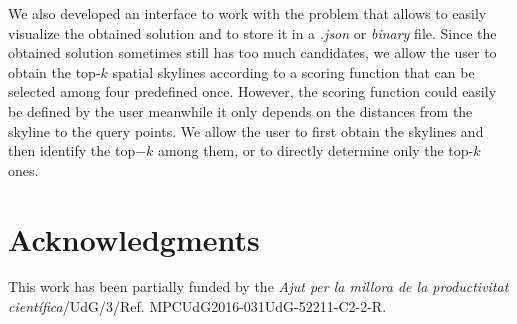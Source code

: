 \documentclass[11pt,onecolumn]{elsart3p}
\begin{document}
We also developed an interface to work with the problem that allows to easily visualize the obtained solution and to store it in a {\it .json} or {\it binary} file. Since the obtained solution sometimes still has too much candidates, we allow the user to obtain the top-$k$ spatial skylines according to a scoring function that can be selected among four predefined once. However, the scoring function could easily be defined by the user meanwhile it only depends on the distances from the skyline to the query points. We allow the user to first obtain the skylines and then identify the top$-k$ among them, or to directly determine only the top-$k$ ones.


\section{Acknowledgments}
This work has been partially funded by the {\it Ajut per la millora de la productivitat científica}/UdG/3/Ref. MPCUdG2016-031UdG-52211-C2-2-R.
\end{document}
